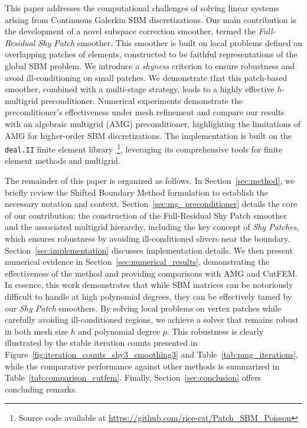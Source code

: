 \documentclass{elsarticle}
\begin{document}
This paper addresses the computational challenges of solving linear systems arising from Continuous Galerkin SBM
discretizations. Our main contribution is the development of a novel subspace correction smoother, termed the
\emph{Full-Residual Shy Patch} smoother. This smoother is built on local problems defined on overlapping patches of
elements, constructed to be faithful representations of the global SBM problem. We introduce a \emph{shyness} criterion
to ensure robustness and avoid ill-conditioning on small patches. We demonstrate that this patch-based smoother,
combined with a multi-stage strategy, leads to a highly effective $h$-multigrid preconditioner. Numerical experiments
demonstrate the preconditioner's effectiveness under mesh refinement and compare our results with an algebraic
multigrid (AMG) preconditioner, highlighting the limitations of AMG for higher-order SBM discretizations. The
implementation is built on the \texttt{deal.II} finite element library~\cite{dealii2019design,
    dealii2024}\footnote{Source code available at \url{https://github.com/rice-cat/Patch_SBM_Poisson}}, leveraging its
comprehensive tools for finite element methods and multigrid.

The remainder of this paper is organized as follows. In Section~\ref{sec:method}, we briefly review the Shifted
Boundary Method formulation to establish the necessary notation and context. Section~\ref{sec:mg_preconditioner}
details the core of our contribution: the construction of the Full-Residual Shy Patch smoother and the associated
multigrid hierarchy, including the key concept of \emph{Shy Patches}, which ensures robustness by avoiding
ill-conditioned slivers near the boundary. Section~\ref{sec:implementation} discusses implementation details. We then
present numerical evidence in Section~\ref{sec:numerical_results}, demonstrating the effectiveness of the method and
providing comparisons with AMG and CutFEM. In essence, this work demonstrates that while SBM matrices can be
notoriously difficult to handle at high polynomial degrees, they can be effectively tamed by our \emph{Shy Patch}
smoothers. By solving local problems on vertex patches while carefully avoiding ill-conditioned regions, we achieve a
solver that remains robust in both mesh size $h$ and polynomial degree $p$. This robustness is clearly illustrated by
the stable iteration counts presented in Figure~\ref{fig:iteration_counts_shy3_smoothing3} and
Table~\ref{tab:pmg_iterations}, while the comparative performance against other methods is summarized in
Table~\ref{tab:comparison_cutfem}. Finally, Section~\ref{sec:conclusion} offers concluding remarks.
\end{document}
